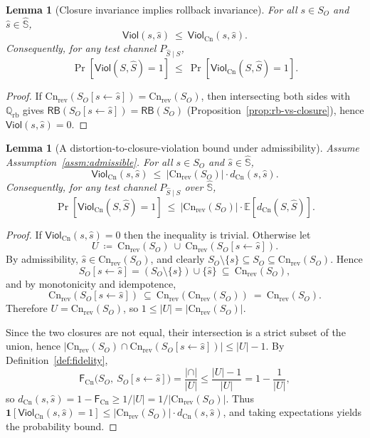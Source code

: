 \documentclass[twoside]{article}
\newtheorem{lemma}[theorem]{Lemma}
\newcommand{\Cn}{\mathrm{Cn}}
\newcommand{\E}{\mathbb{E}}
\newcommand{\1}{\mathbf{1}}
\begin{document}
\begin{lemma}[Closure invariance implies rollback invariance]
\label{lem:closure-implies-rb}
For all \(s\in S_O\) and \(\hat s\in \hat{\mathbb{S}}\),
\[
\mathsf{Viol}(s,\hat s)\ \le\ \mathsf{Viol}_{\Cn}(s,\hat s).
\]
Consequently, for any test channel \(P_{\hat S\mid S}\),
\[
\Pr[\mathsf{Viol}(S,\hat S)=1]\ \le\ \Pr[\mathsf{Viol}_{\Cn}(S,\hat S)=1].
\]
\end{lemma}
\begin{proof}
If \(\Cn_{\mathrm{rev}}(S_O[s\leftarrow \hat s])=\Cn_{\mathrm{rev}}(S_O)\), then intersecting both sides with \(\mathbb Q_{\mathrm{rb}}\)
gives \(\mathsf{RB}(S_O[s\leftarrow \hat s])=\mathsf{RB}(S_O)\) (Proposition~\ref{prop:rb-vs-closure}), hence \(\mathsf{Viol}(s,\hat s)=0\).
\end{proof}

\begin{lemma}[A distortion-to-closure-violation bound under admissibility]
\label{lem:dCn-to-violCn}
Assume Assumption~\ref{assm:admissible}. For all \(s\in S_O\) and \(\hat s\in \hat{\mathbb{S}}\),
\[
\mathsf{Viol}_{\Cn}(s,\hat s)\ \le\ |\Cn_{\mathrm{rev}}(S_O)|\cdot d_{\Cn}(s,\hat s).
\]
Consequently, for any test channel \(P_{\hat S\mid S}\) over \(\hat{\mathbb S}\),
\[
\Pr[\mathsf{Viol}_{\Cn}(S,\hat S)=1]\ \le\ |\Cn_{\mathrm{rev}}(S_O)|\cdot \E[d_{\Cn}(S,\hat S)].
\]
\end{lemma}

\begin{proof}
If \(\mathsf{Viol}_{\Cn}(s,\hat s)=0\) then the inequality is trivial. Otherwise let
\[
U \ \coloneqq\ \Cn_{\mathrm{rev}}(S_O)\ \cup\ \Cn_{\mathrm{rev}}(S_O[s\leftarrow \hat s]).
\]
By admissibility, \(\hat s\in \Cn_{\mathrm{rev}}(S_O)\), and clearly \(S_O\setminus\{s\}\subseteq S_O\subseteq \Cn_{\mathrm{rev}}(S_O)\).
Hence
\[
S_O[s\leftarrow \hat s]=(S_O\setminus\{s\})\cup\{\hat s\}\ \subseteq\ \Cn_{\mathrm{rev}}(S_O),
\]
and by monotonicity and idempotence,
\[
\Cn_{\mathrm{rev}}(S_O[s\leftarrow \hat s])\ \subseteq\ \Cn_{\mathrm{rev}}(\Cn_{\mathrm{rev}}(S_O))\ =\ \Cn_{\mathrm{rev}}(S_O).
\]
Therefore \(U=\Cn_{\mathrm{rev}}(S_O)\), so \(1\le |U|=|\Cn_{\mathrm{rev}}(S_O)|\).

Since the two closures are not equal, their intersection is a strict subset of the union, hence
\(|\Cn_{\mathrm{rev}}(S_O)\cap \Cn_{\mathrm{rev}}(S_O[s\leftarrow \hat s])|\le |U|-1\).
By Definition~\ref{def:fidelity},
\[
\mathsf F_{\Cn}\bigl(S_O,\ S_O[s\leftarrow \hat s]\bigr)
=\frac{|\cap|}{|U|}
\le \frac{|U|-1}{|U|}
=1-\frac{1}{|U|},
\]
so \(d_{\Cn}(s,\hat s)=1-\mathsf F_{\Cn}\ge 1/|U|=1/|\Cn_{\mathrm{rev}}(S_O)|\).
Thus \(\1[\mathsf{Viol}_{\Cn}(s,\hat s)=1]\le |\Cn_{\mathrm{rev}}(S_O)|\cdot d_{\Cn}(s,\hat s)\), and taking expectations yields the
probability bound.
\end{proof}
\end{document}
